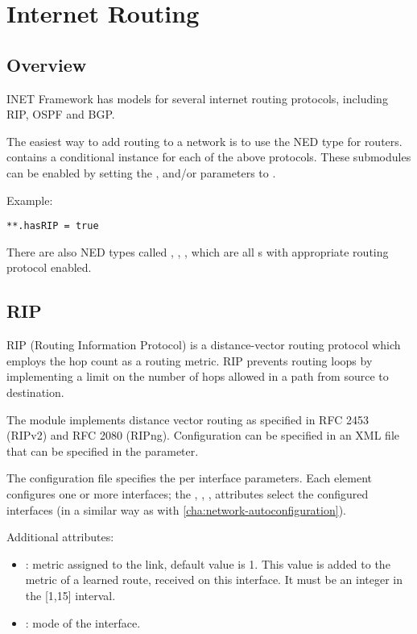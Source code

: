 \chapter{Internet Routing}
\label{cha:routing}

\section{Overview}

INET Framework has models for several internet routing protocols, including
RIP, OSPF and BGP.

The easiest way to add routing to a network is to use the 
NED type for routers.  contains a conditional instance
for each of the above protocols. These submodules can be enabled by
setting the ,  and/or  parameters to
.

Example:

\begin{verbatim}
**.hasRIP = true
\end{verbatim}

There are also NED types called , ,
, which are all s with appropriate
routing protocol enabled.

\section{RIP}
\label{sec:rip}

RIP (Routing Information Protocol) is a distance-vector routing protocol
which employs the hop count as a routing metric. RIP prevents routing loops
by implementing a limit on the number of hops allowed in a path from source
to destination.

The  module implements distance vector routing as
specified in RFC 2453 (RIPv2) and RFC 2080 (RIPng). Configuration
can be specified in an XML file that can be specified in the
 parameter.

The configuration file specifies the per interface parameters.
Each  element configures one or more interfaces;
the , , ,  attributes
select the configured interfaces (in a similar way as with
 \ref{cha:network-autoconfiguration}).

Additional attributes:
\begin{itemize}
  \item {}: metric assigned to the link, default value is 1.
        This value is added to the metric of a learned route,
        received on this interface. It must be an integer in
        the [1,15] interval.
  \item {}: mode of the interface.
\end{itemize}

